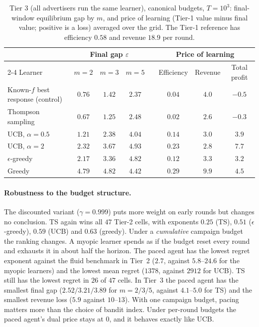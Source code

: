 \documentclass[11pt]{article}
\begin{document}
\begin{table}[t]
\centering\small
\caption{Tier 3 (all advertisers run the same learner), canonical budgets, $T=10^3$: final-window
equilibrium gap by $m$, and price of learning (Tier-1 value minus final value; positive is a loss)
averaged over the grid. The Tier-1 reference has efficiency $0.58$ and revenue $18.9$ per round.}
\label{tab:t3}
\begin{tabular}{@{}lccccccc@{}}
\toprule
 & \multicolumn{3}{c}{Final gap $\varepsilon$} & & \multicolumn{3}{c}{Price of learning}\\
\cmidrule{2-4}\cmidrule{6-8}
Learner & $m=2$ & $m=3$ & $m=5$ & & Efficiency & Revenue & Total profit\\
\midrule
Known-$f$ best response (control) & $0.76$ & $1.42$ & $2.37$ & & $0.04$ & $4.0$ & $-0.5$\\
Thompson sampling & $\mathbf{0.67}$ & $\mathbf{1.25}$ & $2.48$ & & $\mathbf{0.02}$ & $\mathbf{2.6}$ & $-0.3$\\
UCB, $\alpha=0.5$ & $1.21$ & $2.38$ & $4.04$ & & $0.14$ & $3.0$ & $3.9$\\
UCB, $\alpha=2$ & $2.32$ & $3.67$ & $4.93$ & & $0.23$ & $2.8$ & $7.7$\\
$\epsilon$-greedy & $2.17$ & $3.36$ & $4.82$ & & $0.12$ & $3.3$ & $3.2$\\
Greedy & $4.79$ & $4.82$ & $4.42$ & & $0.29$ & $9.9$ & $4.5$\\
\bottomrule
\end{tabular}
\end{table}

\paragraph{Robustness to the budget structure.} The discounted variant ($\gamma=0.999$) puts more weight on
early rounds but changes no conclusion. TS again wins all $47$ Tier-2 cells, with exponents $0.25$ (TS),
$0.51$ ($\epsilon$-greedy), $0.59$ (UCB) and $0.63$ (greedy). Under a \emph{cumulative} campaign budget
the ranking changes. A myopic learner spends as if the budget reset every round and exhausts it in about half
the horizon. The paced agent has the lowest regret exponent against the fluid benchmark in Tier~2
($2.7$, against $5.8$--$24.6$ for the myopic learners) and the lowest mean regret ($1378$, against
$2912$ for UCB). TS still has the lowest regret in $26$ of $47$ cells. In Tier~3 the paced agent has the
smallest final gap ($2.52/3.21/3.89$ for $m=2/3/5$, against $4.1$--$5.0$ for TS) and the smallest
revenue loss ($5.9$ against $10$--$13$). With one campaign budget, pacing matters more than the choice
of bandit index. Under per-round budgets the paced agent's dual price stays at $0$, and it behaves
exactly like UCB.
\end{document}
